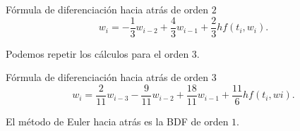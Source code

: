 \begin{method}{Fórmula de diferenciación hacia atrás de orden $2$}
    \begin{equation*}
        w_i = - \frac{1}{3}w_{i-2} + \frac{4}{3}w_{i-1}
            + \frac{2}{3}hf(t_i, w_i).
    \end{equation*}
\end{method}

Podemos repetir los cálculos para el orden $3$.

\begin{method}{Fórmula de diferenciación hacia atrás de orden $3$}
    \begin{equation*}
        w_i = \frac{2}{11}w_{i-3} - \frac{9}{11}w_{i-2} + \frac{18}{11}w_{i-1}
            + \frac{11}{6}hf(t_i, wi).
    \end{equation*}
\end{method}

\begin{remark}
    El método de Euler hacia atrás es la BDF de orden $1$.
\end{remark}

